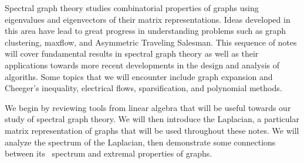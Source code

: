 Spectral graph theory studies combinatorial properties of graphs using eigenvalues and eigenvectors of their matrix representations. Ideas developed in this area have lead to great progress in understanding problems such as graph clustering, maxflow, and Asymmetric Traveling Salesman. This sequence of notes will cover fundamental results in spectral graph theory as well as their applications towards more recent developments in the design and analysis of algoriths. Some topics that we will encounter include graph expansion and Cheeger's inequality, electrical flows, sparsification, and polynomial methods. 

We begin by reviewing tools from linear algebra that will be useful towards our study of spectral graph theory. We will then introduce the Laplacian, a particular matrix representation of graphs that will be used throughout these notes. We will analyze the spectrum of the Laplacian, then demonstrate some connections between its~ spectrum and extremal properties of graphs.
